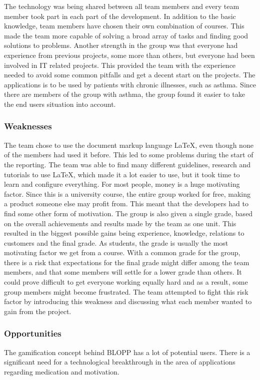 The technology was being shared between all team members and every team member took part in each part of the development. 
In addition to the basic knowledge, team members have chosen their own combination of courses. 
This made the team more capable of solving a broad array of tasks and finding good solutions to problems. 
Another strength in the group was that everyone had experience from previous projects, some more 
than others, but everyone had been involved in IT related projects. This provided the team with 
the experience needed to avoid some common pitfalls and get a decent start on the projects. 
The applications is to be used by patients with chronic illnesses, such as asthma. Since there are 
members of the group with asthma, the group found it easier to take the end users situation into account.


\subsubsection{Weaknesses}
The team chose to use the document markup language \LaTeX, even though none of the members 
had used it before. This led to some problems during the start of the reporting. The team 
was able to find many different guidelines, research and tutorials to use \LaTeX, which made 
it a lot easier to use, but it took time to learn and configure everything. 
For most people, money is a huge motivating factor. Since this is a university course, 
the entire group worked for free, making a product someone else may profit from. 
This meant that the developers had to find some other form of motivation. 
The group is also given a single grade, based on the overall achievements and results made 
by the team as one unit. This resulted in the biggest possible gains being experience, 
knowledge, relations to customers and the final grade. As students, the grade is usually the 
most motivating factor we get from a course. With a common grade for the group, there is a 
risk that expectations for the final grade might differ among the team members, and that 
some members will settle for a lower grade than others. It could prove difficult to get 
everyone working equally hard and as a result, some group members might become frustrated. 
The team attempted to fight this risk factor by introducing this weakness and discussing what 
each member wanted to gain from the project.

\subsubsection{Opportunities}
The gamification concept behind BLOPP has a lot of potential users. There is a 
significant need for a technological breakthrough in the area of applications regarding
medication and motivation.

